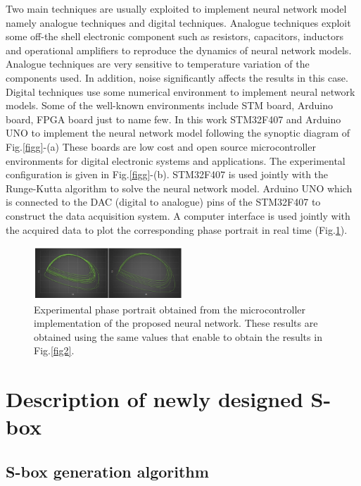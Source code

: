 \documentclass[journal]{IEEEtran/IEEEtran}
\begin{document}
Two main techniques are usually exploited to implement neural network model namely analogue techniques and digital techniques. Analogue techniques exploit some off-the shell electronic component such as resistors, capacitors, inductors and operational amplifiers to reproduce the dynamics of neural network models. Analogue techniques are very sensitive to temperature variation of the components used. In addition, noise significantly affects the results in this case. Digital techniques use some numerical environment to implement neural network models. Some of the well-known environments include STM board, Arduino board, FPGA board just to name few. In this work STM32F407 and Arduino UNO to implement the neural network model following the synoptic diagram of Fig.\ref{figg}-(a) These boards are low cost and open source microcontroller environments for digital electronic systems and applications. The experimental configuration is given in Fig.\ref{figg}-(b). STM32F407 is used jointly with the Runge-Kutta algorithm to solve the neural network model. Arduino UNO which is connected to the DAC (digital to analogue) pins of the STM32F407 to construct the data acquisition system. A computer interface is used jointly with the acquired data to plot the corresponding phase portrait in real time (Fig.\ref{figgg}).

\begin{figure}[!t]
	\centering
	\includegraphics[width=0.5\textwidth]{figgg.png}
		\caption{Experimental phase portrait obtained from the microcontroller implementation of the proposed neural network. These results are obtained using the same values that enable to obtain the results in Fig.\ref{fig2}.}
	\label{figgg}
\end{figure}


\section{Description of newly designed S-box}
\label{sec3}
\subsection{S-box generation algorithm}
\end{document}
